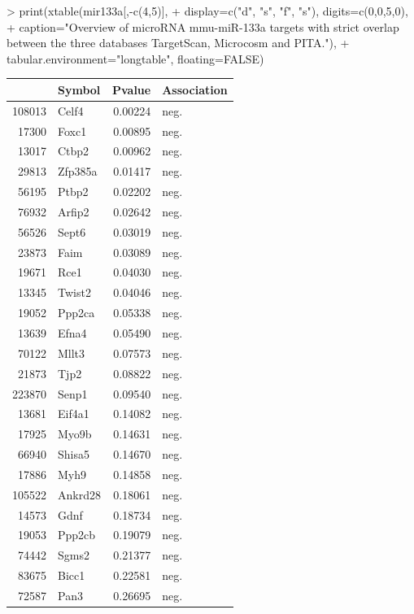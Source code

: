 \documentclass{article}
\begin{document}
\begin{Schunk}
\begin{Sinput}
> print(xtable(mir133a[,-c(4,5)],
+        display=c("d", "s", "f", "s"), digits=c(0,0,5,0),
+        caption="Overview of microRNA mmu-miR-133a targets with strict overlap between the three databases TargetScan, Microcosm and PITA."),
+        tabular.environment="longtable", floating=FALSE)
\end{Sinput}
\begin{longtable}{rlrl}
  \hline
 & Symbol & Pvalue & Association \\ 
  \hline
108013 & Celf4 & 0.00224 & neg. \\ 
  17300 & Foxc1 & 0.00895 & neg. \\ 
  13017 & Ctbp2 & 0.00962 & neg. \\ 
  29813 & Zfp385a & 0.01417 & neg. \\ 
  56195 & Ptbp2 & 0.02202 & neg. \\ 
  76932 & Arfip2 & 0.02642 & neg. \\ 
  56526 & Sept6 & 0.03019 & neg. \\ 
  23873 & Faim & 0.03089 & neg. \\ 
  19671 & Rce1 & 0.04030 & neg. \\ 
  13345 & Twist2 & 0.04046 & neg. \\ 
  19052 & Ppp2ca & 0.05338 & neg. \\ 
  13639 & Efna4 & 0.05490 & neg. \\ 
  70122 & Mllt3 & 0.07573 & neg. \\ 
  21873 & Tjp2 & 0.08822 & neg. \\ 
  223870 & Senp1 & 0.09540 & neg. \\ 
  13681 & Eif4a1 & 0.14082 & neg. \\ 
  17925 & Myo9b & 0.14631 & neg. \\ 
  66940 & Shisa5 & 0.14670 & neg. \\ 
  17886 & Myh9 & 0.14858 & neg. \\ 
  105522 & Ankrd28 & 0.18061 & neg. \\ 
  14573 & Gdnf & 0.18734 & neg. \\ 
  19053 & Ppp2cb & 0.19079 & neg. \\ 
  74442 & Sgms2 & 0.21377 & neg. \\ 
  83675 & Bicc1 & 0.22581 & neg. \\ 
  72587 & Pan3 & 0.26695 & neg. \\ 

\end{longtable}
\end{Schunk}
\end{document}
